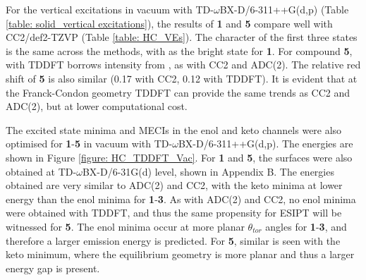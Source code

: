 For the vertical excitations in vacuum with TD-$\omega$BX-D/6-311++G(d,p) (Table \ref{table: solid_vertical excitations}), the results of \textbf{1} and \textbf{5} compare well with CC2/def2-TZVP (Table \ref{table: HC_VEs}). The character of the first three states is the same across the  methods, with \sone{} as the bright state \pipistar{} for \textbf{1}. For compound \textbf{5}, with TDDFT \stwo{} borrows intensity from \sone{}, as with CC2 and ADC(2). The relative red shift of \textbf{5} is also similar (0.17 with CC2, 0.12 with TDDFT). It is evident that at the Franck-Condon geometry TDDFT can provide the same trends as CC2 and ADC(2), but at lower computational cost.

The excited state minima and \ac{MECI}s in the enol and keto channels were also optimised for \textbf{1}-\textbf{5} in vacuum with TD-$\omega$BX-D/6-311++G(d,p). The energies are shown in Figure \ref{figure: HC_TDDFT_Vac}. For \textbf{1} and \textbf{5}, the surfaces were also obtained at TD-$\omega$BX-D/6-31G(d) level, shown in Appendix B. The energies obtained are very similar to ADC(2) and CC2, with the keto minima at lower energy than the enol minima for \textbf{1}-\textbf{3}. As with ADC(2) and CC2, no enol minima were obtained with TDDFT, and thus the same propensity for ESIPT will be witnessed for \textbf{5}. The enol minima occur at more planar $\theta_{tor}$ angles for \textbf{1}-\textbf{3}, and therefore a larger emission energy is predicted. For \textbf{5}, similar is seen with the keto minimum, where the equilibrium geometry is more planar and thus a larger energy gap is present.

